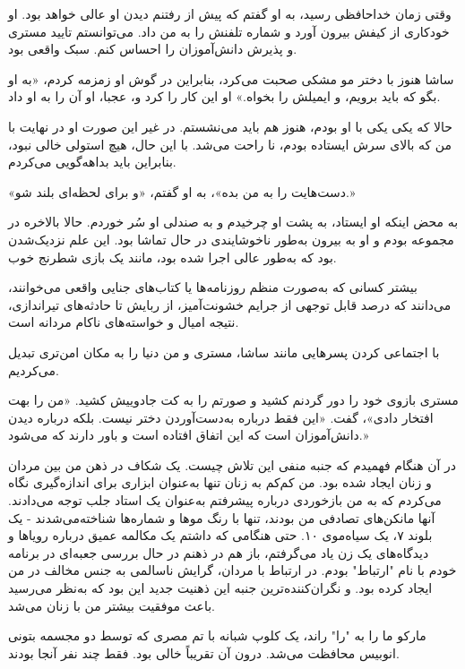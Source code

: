 وقتی زمان خداحافظی رسید، به او گفتم که پیش از رفتنم دیدن او عالی خواهد بود. او خودکاری از کیفش بیرون آورد و شماره تلفنش را به من داد. می‌توانستم تایید مستری و پذیرش دانش‌آموزان را احساس کنم. سبک واقعی بود.

ساشا هنوز با دختر مو مشکی صحبت می‌کرد، بنابراین در گوش او زمزمه کردم، «به او بگو که باید برویم، و ایمیلش را بخواه.» او این کار را کرد و، عجبا، او آن را به او داد.

حالا که یکی یکی با او بودم، هنوز هم باید می‌نشستم. در غیر این صورت او در نهایت با من که بالای سرش ایستاده بودم، نا راحت می‌شد. با این حال، هیچ استولی خالی نبود، بنابراین باید بداهه‌گویی می‌کردم.

«دست‌هایت را به من بده»، به او گفتم، «و برای لحظه‌ای بلند شو.»

به محض اینکه او ایستاد، به پشت او چرخیدم و به صندلی او سُر خوردم. حالا بالاخره در مجموعه بودم و او به بیرون به‌طور ناخوشایندی در حال تماشا بود. این علم نزدیک‌شدن بود که به‌طور عالی اجرا شده بود، مانند یک بازی شطرنج خوب.

بیشتر کسانی که به‌صورت منظم روزنامه‌ها یا کتاب‌های جنایی واقعی می‌خوانند، می‌دانند که درصد قابل توجهی از جرایم خشونت‌آمیز، از ربایش تا حادثه‌های تیراندازی، نتیجه امیال و خواسته‌های ناکام مردانه است.

با اجتماعی کردن پسرهایی مانند ساشا، مستری و من دنیا را به مکان امن‌تری تبدیل می‌کردیم.

مستری بازوی خود را دور گردنم کشید و صورتم را به کت جادوییش کشید. «من را بهت افتخار دادی»، گفت. «این فقط درباره به‌دست‌آوردن دختر نیست. بلکه درباره دیدن دانش‌آموزان است که این اتفاق افتاده است و باور دارند که می‌شود.»

در آن هنگام فهمیدم که جنبه منفی این تلاش چیست. یک شکاف در ذهن من بین مردان و زنان ایجاد شده بود. من کم‌کم به زنان تنها به‌عنوان ابزاری برای اندازه‌گیری نگاه می‌کردم که به من بازخوردی درباره پیشرفتم به‌عنوان یک استاد جلب توجه می‌دادند. آنها مانکن‌های تصادفی من بودند، تنها با رنگ موها و شماره‌ها شناخته‌می‌شدند - یک بلوند ۷، یک سیاه‌موی ۱۰. حتی هنگامی که داشتم یک مکالمه عمیق درباره رویاها و دیدگاه‌های یک زن یاد می‌گرفتم، باز هم در ذهنم در حال بررسی جعبه‌ای در برنامه خودم با نام "ارتباط" بودم. در ارتباط با مردان، گرایش ناسالمی به جنس مخالف در من ایجاد کرده بود. و نگران‌کننده‌ترین جنبه این ذهنیت جدید این بود که به‌نظر می‌رسید باعث موفقیت بیشتر من با زنان می‌شد.

مارکو ما را به "را" راند، یک کلوپ شبانه با تم مصری که توسط دو مجسمه بتونی انوبیس محافظت می‌شد. درون آن تقریباً خالی بود. فقط چند نفر آنجا بودند.